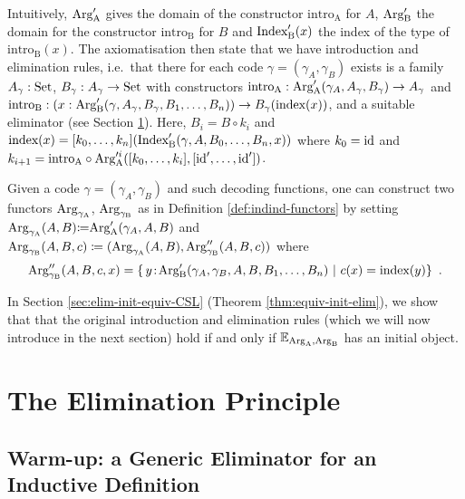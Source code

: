 \documentclass[orivec,envcountsame, ,envcountsect]{llncs}
\begin{document}
Intuitively, $\text{Arg}_{\text{A}}'$ gives the domain of the constructor
$\text{intro}_{\text{A}}$ for $A$, $\text{Arg}_{\text{B}}'$ the domain for the
constructor $\text{intro}_{\text{B}}$ for $B$ and $\text{Index}'_{\text{B}}(x)$ the
index of the type of $\text{intro}_{\text{B}}(x)$.  The axiomatisation
then state that we have introduction and elimination rules, i.e.\ that
there for each code $\gamma = (\gamma_A, \gamma_B)$ exists is a family
$A_\gamma : \text{Set}$, $B_\gamma : A_\gamma \to \text{Set}$ with constructors
$\text{intro}_{\text{A}} : \text{Arg}_{\text{A}}'(\gamma_A, A_\gamma, B_\gamma) \to
A_\gamma$ and $\text{intro}_{\text{B}} : (x : \text{Arg}_{\text{B}}'(\gamma,
A_\gamma, B_\gamma, B_1, \ldots, B_n)) \to B_\gamma(\text{index}(x))$,
and a suitable eliminator (see Section \ref{sec:eliminator}). Here,
$B_i = B \circ k_i$ and $\text{index}(x) = [k_0,
  \ldots, k_n](\text{Index}'_{\text{B}}(\gamma, A, B_0, \ldots, B_n, x))$ where $k_0 = \text{id}$ and $k_{i+1}
= \text{intro}_{\text{A}} \circ \text{Arg}_{\text{A}}'^i([k_0,
  \ldots, k_{i}], [\text{id}', \ldots, \text{id}'])$.

Given a code $\gamma = (\gamma_A, \gamma_B)$ and such decoding functions, one
can construct two functors $\text{Arg}_{\gamma_\text{A}}$, $\text{Arg}_{\gamma_\text{B}}$ as in Definition \ref{def:indind-functors}
by setting $\text{Arg}_{\gamma_\text{A}}(A, B) {\coloneqq} \text{Arg}_{\text{A}}'(\gamma_A, A, B)$ and
$\text{Arg}_{\gamma_\text{B}}(A, B, c) \coloneqq (\text{Arg}_{\gamma_\text{A}}(A, B), \text{Arg}_{\gamma_\text{B}}''(A, B, c))$ where
\[
\text{Arg}_{\gamma_\text{B}}''(A, B, c, x) = \{\, y\!:\!\text{Arg}_{\text{B}}'(\gamma_A, \gamma_B, A, B, B_1, \ldots, B_n)
                                                \ |\  c(x) = \text{index}(y) \} \enspace .
\]


In Section \ref{sec:elim-init-equiv-CSL} (Theorem
\ref{thm:equiv-init-elim}), we show that that the original
introduction and elimination rules (which we will now introduce in the
next section) hold %
if and only if $\mathbb{E}_{\text{Arg}_{\text{A}}, \text{Arg}_{\text{B}}}$ has an initial object.


\section{The Elimination Principle}
\label{sec:eliminator}


\subsection{Warm-up: a Generic Eliminator for an Inductive Definition}
\label{sec:elim-ind-intro}
\end{document}
